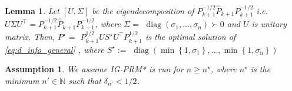 \documentclass[Afour,sageh,times]{sagej}
\newtheorem{lemma}{\bf Lemma}
\newtheorem{assumption}{\bf Assumption}
\begin{document}
\begin{lemma}
  Let $[U, \Sigma]$ be the eigendecomposition of $P_{k+1}^{-1 / 2} \hat{P}_{k+1} P_{k+1}^{-1 / 2}$ i.e. $U \Sigma U^{\top}=P_{k+1}^{-1 / 2} \hat{P}_{k+1} P_{k+1}^{-1 / 2}$, where $\Sigma=$ $\operatorname{diag}\left(\sigma_1, \ldots, \sigma_n\right) \succ 0$ and $U$ is unitary matrix. Then, $P^\star=$ $P_{k+1}^{1 / 2} U S^\star U^{\top} P_{k+1}^{1 / 2}$ is the optimal solution of \eqref{eq:d_info_general} , where $S^\star:=$ $\operatorname{diag}\left(\min \left\{1, \sigma_1\right\}, \ldots, \min \left\{1, \sigma_{\mathrm{n}}\right\}\right)$
 \label{lemma:analytical}
\end{lemma}
\begin{assumption}
    \normalfont We assume IG-PRM* is run for $n\geq n^\star$, where $n^\star$ is the minimum $n'\in  \mathbb{N}$ such that $\delta_{n'}< 1/2$.
\end{assumption}
 {
}   
\end{document}
